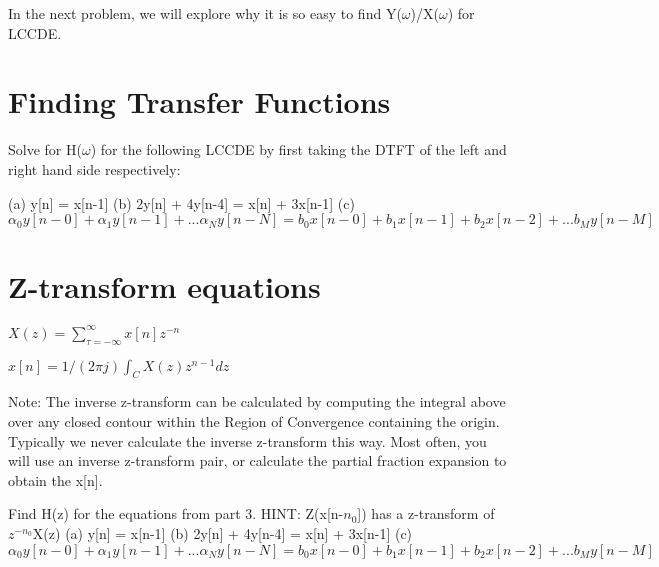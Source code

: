 \documentclass[11pt]{article}
\begin{document}
\vspace{2mm}

In the next problem, we will explore why it is so easy to find Y($\omega$)/X($\omega$) for LCCDE. 
\vspace{2mm}


\section{Finding Transfer Functions}

Solve for H($\omega$) for the following LCCDE by first taking the DTFT of the left and right hand side respectively:\newline

(a) y[n] = x[n-1]\newline
(b) 2y[n] + 4y[n-4] = x[n] + 3x[n-1]\newline
(c) $\alpha_0 y[n - 0] + \alpha_1 y[n - 1] + ... \alpha_N y[n - N] =  b_0 x[n - 0] + b_1 x[n - 1] + b_2 x[n - 2] + ... b_M y[n - M] 
$


\section{Z-transform equations}

\vspace{3mm}

\begin{center}

$
X(z) = \sum_{\tau  = -\infty}^{\infty} x[n] z^{-n}
$
\end{center}

\vspace{3mm}


\begin{center}

$
x[n]= 1/(2 \pi j) \int_C X(z) z^{n-1}dz
$
\end{center}

Note:\newline
The inverse z-transform can be calculated by computing the integral above over any closed contour within the Region of Convergence containing the origin. Typically we never calculate the inverse z-transform this way. Most often, you will use an inverse z-transform pair, or calculate the partial fraction expansion to obtain the x[n].

\vspace{2mm}

Find H(z) for the equations from part 3. HINT: Z(x[n-$n_0$]) has a z-transform of $z^{-n_0}$X(z)  \newline
(a) y[n] = x[n-1]\newline
(b) 2y[n] + 4y[n-4] = x[n] + 3x[n-1]\newline
(c) $\alpha_0 y[n - 0] + \alpha_1 y[n - 1] + ... \alpha_N y[n - N] =  b_0 x[n - 0] + b_1 x[n - 1] + b_2 x[n - 2] + ... b_M y[n - M] 
$
\end{document}
